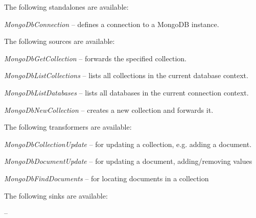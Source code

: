 \documentclass[a4paper]{book}
\begin{document}
The following standalones are available:
\begin{tight_itemize}
  \item \textit{MongoDbConnection} -- defines a connection to a MongoDB instance.
\end{tight_itemize}

The following sources are available:
\begin{tight_itemize}
  \item \textit{MongoDbGetCollection} -- forwards the specified collection.
  \item \textit{MongoDbListCollections} -- lists all collections in the current
  database context.
  \item \textit{MongoDbListDatabases} -- lists all databases in the current
  connection context.
  \item \textit{MongoDbNewCollection} -- creates a new collection and forwards it.
\end{tight_itemize}

The following transformers are available:
\begin{tight_itemize}
  \item \textit{MongoDbCollectionUpdate} -- for updating a collection, e.g. adding a document.
  \item \textit{MongoDbDocumentUpdate} -- for updating a document, adding/removing values
  \item \textit{MongoDbFindDocuments} -- for locating documents in a collection
\end{tight_itemize}

The following sinks are available:
\begin{tight_itemize}
  \item \textit{} --
\end{tight_itemize}



\end{document}
